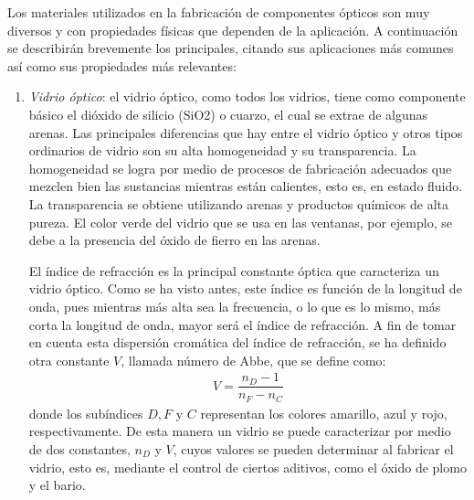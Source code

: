 \documentclass[14pt]{extarticle}
\begin{document}
Los materiales utilizados en la fabricación de componentes ópticos son muy diversos y con propiedades físicas que dependen de la aplicación. A continuación se describirán brevemente los principales, citando sus aplicaciones más comunes así como sus propiedades más relevantes:
\begin{enumerate}[label=\alph*)]
\item \textit{Vidrio óptico}: el vidrio óptico, como todos los vidrios, tiene como componente básico el dióxido de silicio (SiO2) o cuarzo, el cual se extrae de algunas arenas. Las principales diferencias que hay entre el vidrio óptico y otros tipos ordinarios de vidrio son su alta homogeneidad y su transparencia. La homogeneidad se logra por medio de procesos de fabricación adecuados que mezclen bien las sustancias mientras están calientes, esto es, en estado fluido. La transparencia se obtiene utilizando arenas y productos químicos de alta pureza. El color verde del vidrio que se usa en las ventanas, por ejemplo, se debe a la presencia del óxido de fierro en las arenas.

El índice de refracción es la principal constante óptica que caracteriza un vidrio óptico. Como se ha visto antes, este índice es función de la longitud de onda, pues mientras más alta sea la frecuencia, o lo que es lo mismo, más corta la longitud de onda, mayor será el índice de refracción. A fin de tomar en cuenta esta dispersión cromática del índice de refracción, se ha definido otra constante $V$, llamada número de Abbe, que se define como:
\begin{align}
V = \dfrac{n_{D} - 1}{n_{F} - n_{C}}
\label{eq:ecuacion_I_59}
\end{align}
donde los subíndices $D, F$ y $C$ representan los colores amarillo, azul y rojo, respectivamente. De esta manera un vidrio se puede caracterizar por medio de dos constantes, $n_{D}$ y $V$, cuyos valores se pueden determinar al fabricar el vidrio, esto es, mediante el control de ciertos aditivos, como el óxido de plomo y el bario.


\end{enumerate}
\end{document}
